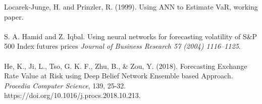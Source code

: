 \documentclass[a4paper,11pt,oneside]{book}
\begin{document}
Locarek-Junge, H. and Prinzler, R. (1999). Using ANN to Estimate VaR, working
paper.\\\\
S. A. Hamid and Z. Iqbal. Using neural networks for forecasting volatility of S\&P 500 Index futures prices \textit{Journal of Business Research 57 (2004) 1116–1125}.\\\\
He, K., Ji, L., Tso, G. K. F., Zhu, B., \& Zou, Y. (2018). Forecasting Exchange Rate Value at Risk using Deep Belief Network Ensemble based Approach. \textit{Procedia Computer Science}, 139, 25-32.
https://doi.org/10.1016/j.procs.2018.10.213.





\listoffigures
\listoftables


\end{document}
